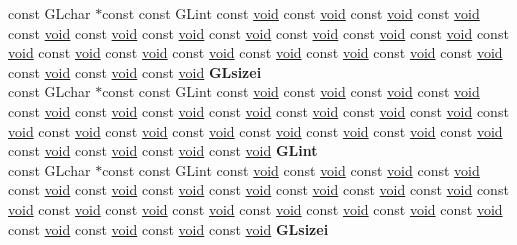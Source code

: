\begin{DoxyCompactItemize}
\begin{tabbing}
\>const GLchar $\ast$const const GLint const \hyperlink{interfacevoid}{void} const \hyperlink{interfacevoid}{void} const \hyperlink{interfacevoid}{void} const \hyperlink{interfacevoid}{void} const \hyperlink{interfacevoid}{void} const \hyperlink{interfacevoid}{void} const \hyperlink{interfacevoid}{void} const \hyperlink{interfacevoid}{void} const \hyperlink{interfacevoid}{void} const \hyperlink{interfacevoid}{void} const \hyperlink{interfacevoid}{void} const \hyperlink{interfacevoid}{void} const \hyperlink{interfacevoid}{void} const \hyperlink{interfacevoid}{void} const \hyperlink{interfacevoid}{void} const \hyperlink{interfacevoid}{void} const \hyperlink{interfacevoid}{void} const \hyperlink{interfacevoid}{void} const \hyperlink{interfacevoid}{void} const \hyperlink{interfacevoid}{void} const \hyperlink{interfacevoid}{void} const \hyperlink{interfacevoid}{void} {\bfseries GLsizei}\\
\>const GLchar $\ast$const const GLint const \hyperlink{interfacevoid}{void} const \hyperlink{interfacevoid}{void} const \hyperlink{interfacevoid}{void} const \hyperlink{interfacevoid}{void} const \hyperlink{interfacevoid}{void} const \hyperlink{interfacevoid}{void} const \hyperlink{interfacevoid}{void} const \hyperlink{interfacevoid}{void} const \hyperlink{interfacevoid}{void} const \hyperlink{interfacevoid}{void} const \hyperlink{interfacevoid}{void} const \hyperlink{interfacevoid}{void} const \hyperlink{interfacevoid}{void} const \hyperlink{interfacevoid}{void} const \hyperlink{interfacevoid}{void} const \hyperlink{interfacevoid}{void} const \hyperlink{interfacevoid}{void} const \hyperlink{interfacevoid}{void} const \hyperlink{interfacevoid}{void} const \hyperlink{interfacevoid}{void} const \hyperlink{interfacevoid}{void} const \hyperlink{interfacevoid}{void} const \hyperlink{interfacevoid}{void} {\bfseries GLint}\\
\>const GLchar $\ast$const const GLint const \hyperlink{interfacevoid}{void} const \hyperlink{interfacevoid}{void} const \hyperlink{interfacevoid}{void} const \hyperlink{interfacevoid}{void} const \hyperlink{interfacevoid}{void} const \hyperlink{interfacevoid}{void} const \hyperlink{interfacevoid}{void} const \hyperlink{interfacevoid}{void} const \hyperlink{interfacevoid}{void} const \hyperlink{interfacevoid}{void} const \hyperlink{interfacevoid}{void} const \hyperlink{interfacevoid}{void} const \hyperlink{interfacevoid}{void} const \hyperlink{interfacevoid}{void} const \hyperlink{interfacevoid}{void} const \hyperlink{interfacevoid}{void} const \hyperlink{interfacevoid}{void} const \hyperlink{interfacevoid}{void} const \hyperlink{interfacevoid}{void} const \hyperlink{interfacevoid}{void} const \hyperlink{interfacevoid}{void} const \hyperlink{interfacevoid}{void} const \hyperlink{interfacevoid}{void} {\bfseries GLsizei}\\

\end{tabbing}
\end{DoxyCompactItemize}
